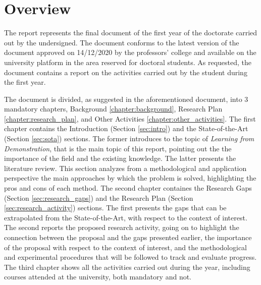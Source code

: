 \clearpage
\chapter*{Overview}\label{chapter:overview}

The report represents the final document of the first year of the doctorate carried out by the undersigned. The document conforms to the latest version of the document \hyperlink{https://corsi.unisa.it/ingegneria-dell-informazione/didattica/guida-dello-studente}{\textit{}} approved on 14/12/2020 by the professors' college and available on the university platform in the area reserved for doctoral students. As requested, the document contains a report on the activities carried out by the student during the first year. \par
The document is divided, as suggested in the aforementioned document, into 3 mandatory chapters, Background \ref{chapter:background}, Research Plan \ref{chapter:research_plan}, and Other Activities \ref{chapter:other_activities}.
\newline The first chapter contains the Introduction (Section \ref{sec:intro}) and the State-of-the-Art (Section \ref{sec:sota}) sections. The former introduces to the topic of \textit{Learning from Demonstration}, that is the main topic of this report, pointing out the the importance of the field and the existing knowledge. The latter presents the literature review. This section analyzes from a methodological and application perspective the main approaches by which the problem is solved, highlighting the pros and cons of each method.
\newline The second chapter containes the Research Gaps (Section \ref{sec:research_gaps}) and the Research Plan (Section \ref{sec:research_activity}) sections. The first presents the gaps that can be extrapolated from the State-of-the-Art, with respect to the context of interest. The second reports the proposed research activity, going on to highlight the connection between the proposal and the gaps presented earlier, the importance of the proposal with respect to the context of interest, and the methodological and experimental procedures that will be followed to track and evaluate progress.
\newline The third chapter shows all the activities carried out during the year, including courses attended at the university, both mandatory and not.
